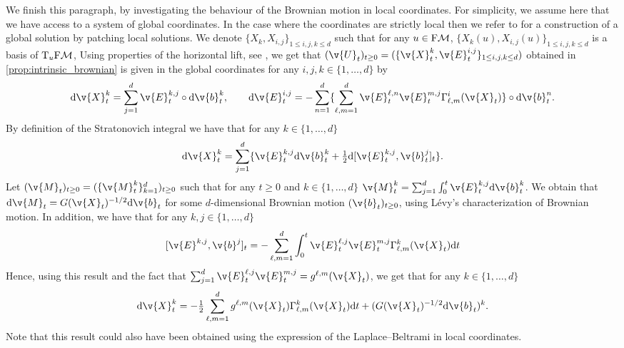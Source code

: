 We finish this paragraph, by investigating the behaviour of the Brownian motion in local coordinates.
For simplicity, we assume here that we have access to a system of global coordinates.
In the case where the coordinates are strictly local then we refer to \textcite[Chapter 5, Theorem 1]{ikeda1989sto} for a construction of a global solution by patching local solutions.
We denote \(\{X_k, X_{i,j}\}_{1 \leq i,j,k \leq d}\) such that for any \(u \in \mathrm{F}\mathcal{M}\), \(\{X_k(u), X_{i,j}(u)\}_{1 \leq i,j,k \leq d}\) is a basis of \(\mathrm{T}_u \mathrm{F}\mathcal{M}\), Using properties of the horizontal lift, see \cite[Chapter 2]{hsu2002stochastic}, we get that \((\v{U}_t)_{t \geq 0} = (\{\v{X}^k_t, \v{E}_t^{i,j}\}_{1 \leq i,j,k \leq d})\) obtained in \cref{prop:intrinsic_brownian} is given in the global coordinates for any \(i,j,k \in \{1, \dots, d\}\) by \begin{equation} { \mathrm{d} \v{X}_t^k = \sum_{j=1}^d \v{E}_t^{k,j} \circ \mathrm{d} \v{b}_t^k , \qquad \mathrm{d} \v{E}_t^{i,j} = - \sum_{n=1}^d \{\sum_{\ell, m=1}^d \v{E}_t^{\ell,n}\v{E}_t^{m,j} \Gamma_{\ell,m}^{i}(\v{X}_t)\} \circ \mathrm{d} \v{b}_t^n .
	}
\end{equation}
By definition of the Stratonovich integral we have that for any \(k \in \{1, \dots, d\}\) \begin{equation} { \mathrm{d} \v{X}_t^k = \sum_{j=1}^d \{ \v{E}_t^{k,j} \mathrm{d} \v{b}_t^k +\tfrac{1}{2} \mathrm{d} [\v{E}_t^{k,j}, \v{b}_t^j]_t \} .
	}
\end{equation}
Let \((\v{M}_t)_{t \geq 0} = (\{\v{M}_t^k\}_{k=1}^d)_{t \geq 0}\) such that for any \(t \geq 0\) and \(k \in \{1, \dots, d\}\) \(\v{M}_t^k = \sum_{j=1}^d \int_0^t \v{E}_t^{k,j} \mathrm{d} \v{b}_t^k\).
We obtain that \(\mathrm{d} \v{M}_t = G(\v{X}_t)^{-1/2} \mathrm{d} \v{b}_t\) for some \(d\)-dimensional Brownian motion \((\v{b}_t)_{t \geq 0}\), using L\'evy's characterization of Brownian motion.
In addition, we have that for any \(k, j \in \{1, \dots, d\}\) \begin{equation} {[\v{E}^{k,j}, \v{b}^j]_t = -\sum_{\ell, m=1}^d \int_0^t \v{E}_t^{\ell, j} \v{E}_t^{m,j} \Gamma_{\ell, m}^k(\v{X}_t) \mathrm{d} t } \end{equation} Hence, using this result and the fact that \(\sum_{j=1}^d \v{E}_t^{\ell, j} \v{E}_t^{m,j} = g^{\ell,m}(\v{X}_t)\), we get that for any \(k \in \{1, \dots, d\}\) \begin{equation} {\mathrm{d} \v{X}_t^k =- \tfrac{1}{2} \sum_{\ell, m=1}^d g^{\ell,m}(\v{X}_t) \Gamma_{\ell, m}^k(\v{X}_t) \mathrm{d} t + (G(\v{X}_t)^{-1/2} \mathrm{d} \v{b}_t)^k .
	}
\end{equation}
Note that this result could also have been obtained using the expression of the Laplace--Beltrami in local coordinates.


